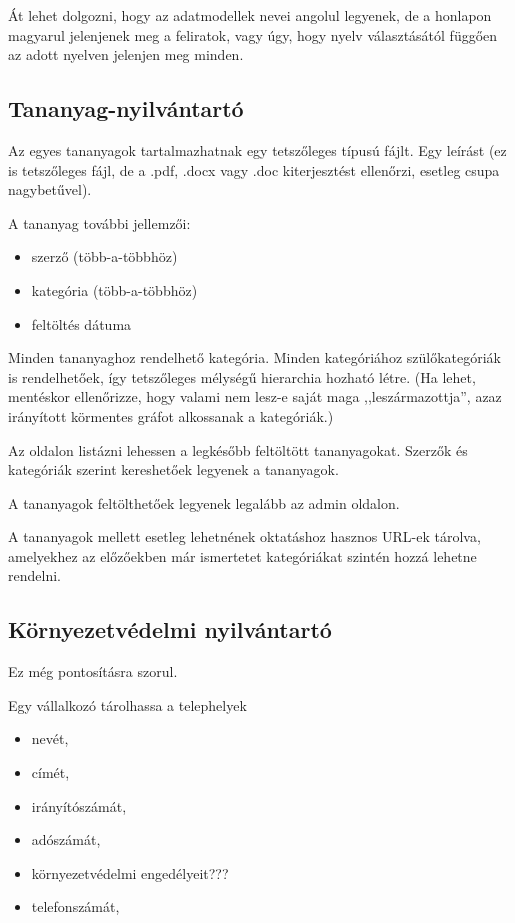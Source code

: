 \documentclass[a4paper]{article}
\begin{document}
Át lehet dolgozni, hogy az adatmodellek nevei angolul legyenek, de a
honlapon magyarul jelenjenek meg a feliratok, vagy úgy, hogy nyelv
választásától függően az adott nyelven jelenjen meg minden.

\subsection{Tananyag-nyilvántartó}

Az egyes tananyagok tartalmazhatnak egy tetszőleges típusú fájlt. Egy
leírást (ez is tetszőleges fájl, de a .pdf, .docx vagy .doc
kiterjesztést ellenőrzi, esetleg csupa nagybetűvel).

A tananyag további jellemzői:
\begin{itemize}
    \item szerző (több-a-többhöz)
    \item kategória (több-a-többhöz)
    \item feltöltés dátuma
\end{itemize}

Minden tananyaghoz rendelhető kategória. Minden kategóriához
szülőkategóriák is rendelhetőek, így tetszőleges mélységű hierarchia
hozható létre. (Ha lehet, mentéskor ellenőrizze, hogy valami nem lesz-e
saját maga ,,leszármazottja'', azaz irányított körmentes gráfot
alkossanak a kategóriák.)

Az oldalon listázni lehessen a legkésőbb feltöltött tananyagokat.
Szerzők és kategóriák szerint kereshetőek legyenek a tananyagok.

A tananyagok feltölthetőek legyenek legalább az admin oldalon.

A tananyagok mellett esetleg lehetnének oktatáshoz hasznos URL-ek
tárolva, amelyekhez az előzőekben már ismertetet kategóriákat szintén
hozzá lehetne rendelni.

\subsection{Környezetvédelmi nyilvántartó}

Ez még pontosításra szorul.

Egy vállalkozó tárolhassa a telephelyek
\begin{itemize}
    \item nevét,
    \item címét,
    \item irányítószámát,
    \item adószámát,
    \item környezetvédelmi engedélyeit???
    \item telefonszámát,
\end{itemize}
\end{document}
